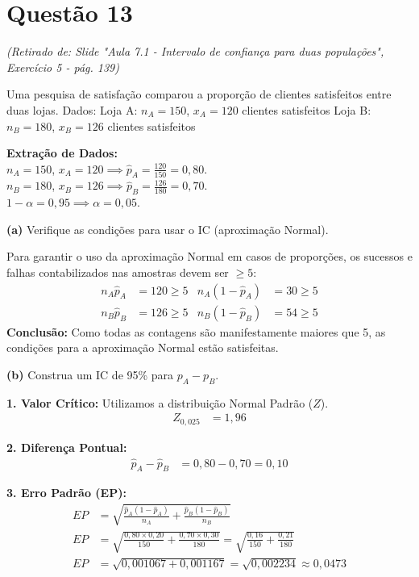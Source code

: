 \documentclass[12pt, a4paper]{article}
\begin{document}
\section*{Questão 13}
\textit{(Retirado de: Slide "Aula 7.1 - Intervalo de confiança para duas populações", Exercício 5 - pág. 139)}

Uma pesquisa de satisfação comparou a proporção de clientes satisfeitos entre duas lojas. Dados:
Loja A: $n_A = 150$, $x_A = 120$ clientes satisfeitos
Loja B: $n_B = 180$, $x_B = 126$ clientes satisfeitos

\vspace{0.3cm}
\noindent\textbf{Extração de Dados:} \\
$n_A = 150$, $x_A = 120 \implies \hat{p}_A = \frac{120}{150} = 0{,}80$. \\
$n_B = 180$, $x_B = 126 \implies \hat{p}_B = \frac{126}{180} = 0{,}70$. \\
$1-\alpha = 0{,}95 \implies \alpha = 0{,}05$.

\medskip\noindent\textbf{(a)} Verifique as condições para usar o IC (aproximação Normal).

\noindent Para garantir o uso da aproximação Normal em casos de proporções, os sucessos e falhas contabilizados nas amostras devem ser $\ge 5$:
\begin{align*}
n_A\hat{p}_A &= 120 \ge 5 & n_A(1-\hat{p}_A) &= 30 \ge 5 \\
n_B\hat{p}_B &= 126 \ge 5 & n_B(1-\hat{p}_B) &= 54 \ge 5
\end{align*}
\textbf{Conclusão:} Como todas as contagens são manifestamente maiores que 5, as condições para a aproximação Normal estão satisfeitas.

\medskip\noindent\textbf{(b)} Construa um IC de 95\% para $p_A - p_B$.

\noindent \textbf{1. Valor Crítico:}
Utilizamos a distribuição Normal Padrão ($Z$).
\begin{align*}
Z_{0{,}025} &= \boxed{1{,}96}
\end{align*}

\noindent \textbf{2. Diferença Pontual:}
\begin{align*}
\hat{p}_A - \hat{p}_B &= 0{,}80 - 0{,}70 = \boxed{0{,}10}
\end{align*}

\noindent \textbf{3. Erro Padrão (EP):}
\begin{align*}
EP &= \sqrt{\frac{\hat{p}_A(1-\hat{p}_A)}{n_A} + \frac{\hat{p}_B(1-\hat{p}_B)}{n_B}} \\
EP &= \sqrt{\frac{0{,}80 \times 0{,}20}{150} + \frac{0{,}70 \times 0{,}30}{180}} = \sqrt{\frac{0{,}16}{150} + \frac{0{,}21}{180}} \\
EP &= \sqrt{0{,}001067 + 0{,}001167} = \sqrt{0{,}002234} \approx \boxed{0{,}0473}
\end{align*}
\end{document}
